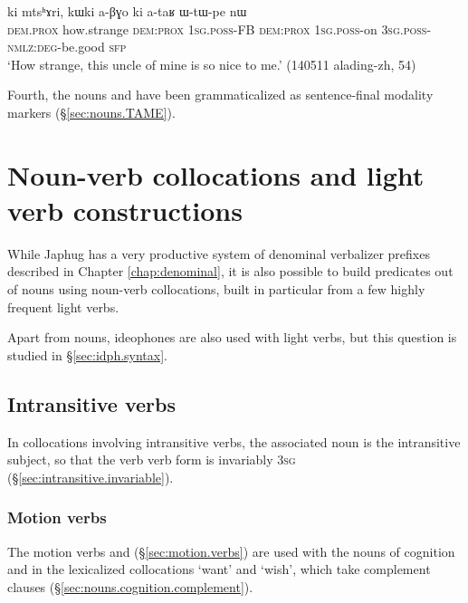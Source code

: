 \begin{exe}
\ex \label{ex:mtshAri.ataR.WtWpe}
\gll ki mtsʰɤri, kɯki a-βɣo ki a-taʁ ɯ-tɯ-pe nɯ \\
\textsc{dem}.\textsc{prox}  how.strange \textsc{dem}:\textsc{prox} \textsc{1sg}.\textsc{poss}-FB \textsc{dem}:\textsc{prox} \textsc{1sg}.\textsc{poss}-on \textsc{3sg}.\textsc{poss}-\textsc{nmlz}:\textsc{deg}-be.good \textsc{sfp} \\
\glt `How strange, this uncle of mine is so nice to me.' (140511 alading-zh, 54)
\end{exe}

Fourth, the nouns  and  have been grammaticalized as sentence-final modality markers (§\ref{sec:nouns.TAME}).
  
  
 
\section{Noun-verb collocations and light verb constructions} \label{sec:light.verb}
While Japhug has a very productive system of denominal verbalizer prefixes described in Chapter \ref{chap:denominal}, it is also possible to build predicates out of nouns using noun-verb collocations, built in particular from a few highly frequent light verbs. 

Apart from nouns, ideophones are also used with light verbs, but this question is studied in §\ref{sec:idph.syntax}.
 
\subsection{Intransitive verbs} \label{sec:intr.light.verbs}
In collocations involving intransitive verbs, the associated noun is the intransitive subject, so that the verb verb form is invariably \textsc{3sg} (§\ref{sec:intransitive.invariable}).

\subsubsection{Motion verbs} \label{sec:motion.light.verbs}
The motion verbs  and   (§\ref{sec:motion.verbs}) are used with the  nouns of cognition  and  in the lexicalized collocations  `want' and   `wish', which take complement clauses (§\ref{sec:nouns.cognition.complement}). 

